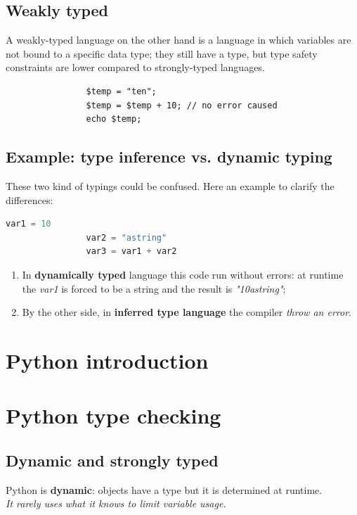 \documentclass[12pt]{article}
\begin{document}
	\subsection{Weakly typed} 
		A weakly-typed language on the other hand is a language in which variables are not bound to a specific data type; they still have a type, but type safety constraints are lower compared to strongly-typed languages.\\
			\begin{lstlisting}
				$temp = "ten"; 
				$temp = $temp + 10; // no error caused
				echo $temp;
			\end{lstlisting}
			
			
		
	
		\subsection{Example: type inference vs. dynamic typing}
			These two kind of typings could be confused. Here an example to clarify the differences:

			\begin{lstlisting}[language=Python]
				var1 = 10
				var2 = "astring"
				var3 = var1 + var2
			\end{lstlisting}
			
			\begin{enumerate}
				\item In \textbf{dynamically typed} language this code run without errors: at runtime the \textit{var1} is forced to be a string and the result is \textit{"10astring"};
				\item By the other side, in \textbf{inferred type language} the compiler \textit{throw an error}.
			\end{enumerate}
\newpage
\section{Python introduction}
\section{Python type checking}
	\subsection{Dynamic and strongly typed}
		Python is \textbf{dynamic}: objects have a type but it is determined at runtime. \\
		\textit{It rarely uses what it knows to limit variable usage.}
		
\end{document}
